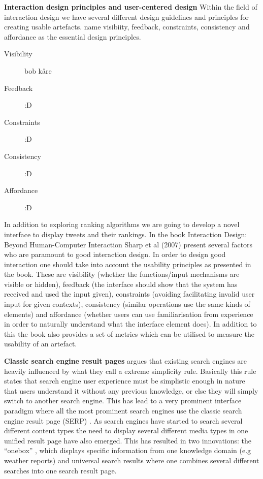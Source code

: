 {\bf Interaction design principles and user-centered design}\newline
Within the field of interaction design we have several different design guidelines and principles for creating usable artefacts. \citet{Sharp2007} name visibiity, feedback, constraints, consistency and affordance as the essential design principles.

\begin{description}
  \item[Visibility] bob kåre
  \item[Feedback]  :D
  \item[Constraints] :D
  \item[Consistency] :D
  \item[Affordance] :D
\end{description}

In addition to exploring ranking algorithms we are going to develop a novel interface to display tweets and their rankings. In the book Interaction Design: Beyond Human-Computer Interaction Sharp et al (2007) present several factors who are paramount to good interaction design. In order to design good interaction one should take into account the usability principles as presented in the book. These are visibility (whether the functions/input mechanisms are visible or hidden), feedback (the interface should show that the system has received and used the input given), constraints (avoiding facilitating invalid user input for given contexts), consistency (similar operations use the same kinds of elements) and affordance (whether users can use familiarisation from experience in order to naturally understand what the interface element does). In addition to this the book also provides a set of metrics which can be utilised to measure the usability of an artefact.\newline

{\bf \noindent Classic search engine result pages}\newline
\citet[p.480]{Baeza-Yates2011} argues that existing search engines are heavily influenced by what they call a extreme simplicity rule. Basically this rule states that search engine user experience must be simplistic enough in nature that users understand it without any previous knowledge, or else they will simply switch to another search engine. This has lead to a very prominent interface paradigm where all the most prominent search engines use the classic search engine result page (SERP) \citep{Baeza-Yates2011}. 
As search engines have started to search several different content types the need to display several different media types in one unified result page have also emerged. This has resulted in two innovations: the “onebox” \citep{Baeza-Yates2011}, which displays specific information from one knowledge domain (e.g weather reports) and universal search results where one combines several different searches into one search result page.


